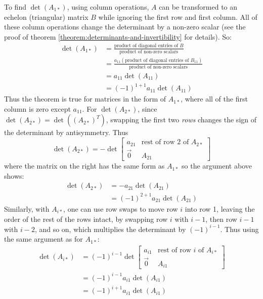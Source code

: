 \documentclass[11pt, letterpaper]{report}
\newenvironment{book}{}{}
\newcounter{theorem}[chapter]
\begin{document}
\begin{book}
To find $\det(A_{1*})$, using column operations, $A$ can be transformed to an echelon (triangular) matrix $B$ while ignoring the first row and first column. All of these column operations change the determinant by a non-zero scalar (see the proof of theorem \ref{theorem:determinants-and-invertibility} for details). So:
\begin{align}
\det(A_{1*}) &= \frac{\text{product of diagonal entries of }B}{\text{product of non-zero scalars}} \nonumber \\ 
&= \frac{a_{11}(\text{product of diagonal entries of }B_{11})}{\text{product of non-zero scalars}} \nonumber \\ 
&= a_{11}\det(A_{11}) \nonumber \\ 
&= (-1)^{1+1}a_{11}\det(A_{11}) \label{eq:3.2-A1}
\end{align}
Thus the theorem is true for matrices in the form of $A_{1*}$, where all of the first column is zero except $a_{11}$. For $\det(A_{2*})$, since $\det(A_{2*}) = \det((A_{2*})^{T})$, swapping the first two \emph{rows} changes the sign of the determinant by antisymmetry. Thus
\[\det(A_{2*}) = -\det \begin{bmatrix}
a_{21} & \text{rest of row 2 of }A_{2*} \\
\vec{0} & A_{21}
\end{bmatrix}\]
where the matrix on the right has the same form as $A_{1*}$ so the argument above shows:
\begin{align}
\det(A_{2*}) &= -a_{21}\det(A_{21}) \nonumber \\
&= (-1)^{2+1}a_{21}\det(A_{21}) \label{eq:3.2-A2}
\end{align}
Similarly, with $A_{i*}$, one can use row swaps to move row $i$ into row 1, leaving the order of the rest of the rows intact, by swapping row $i$ with $i-1$, then row $i-1$ with $i-2$, and so on, which multiplies the determinant by $(-1)^{i-1}$. Thus using the same argument as for $A_{1*}$:
\begin{align}
\det(A_{i*}) &= (-1)^{i-1}\det \begin{bmatrix}
a_{i1} & \text{rest of row }i\text{ of }A_{i*} \\
\vec{0} & A_{i1}
\end{bmatrix} \nonumber \\ 
&=(-1)^{i-1}a_{i1}\det(A_{i1}) \nonumber \\
&= (-1)^{i+1}a_{i1}\det(A_{i1}) \label{eq:3.2-Ai}
\end{align}


\end{book}
\end{document}
